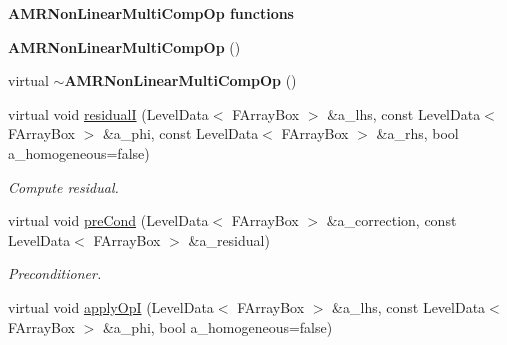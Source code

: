 \begin{Indent}{\bf A\-M\-R\-Non\-Linear\-Multi\-Comp\-Op functions}\par
\begin{DoxyCompactItemize}
\item 
\hypertarget{class_a_m_r_non_linear_multi_comp_op_a2205291922bf767821fcbeb13f52a338}{{\bfseries A\-M\-R\-Non\-Linear\-Multi\-Comp\-Op} ()}\label{class_a_m_r_non_linear_multi_comp_op_a2205291922bf767821fcbeb13f52a338}

\item 
\hypertarget{class_a_m_r_non_linear_multi_comp_op_a6f358cdb028df9d5a9d274fda7c77a77}{virtual {\bfseries $\sim$\-A\-M\-R\-Non\-Linear\-Multi\-Comp\-Op} ()}\label{class_a_m_r_non_linear_multi_comp_op_a6f358cdb028df9d5a9d274fda7c77a77}

\item 
\hypertarget{class_a_m_r_non_linear_multi_comp_op_a8c6014f3d9208f5184d09d700876335b}{virtual void \hyperlink{class_a_m_r_non_linear_multi_comp_op_a8c6014f3d9208f5184d09d700876335b}{residual\-I} (Level\-Data$<$ F\-Array\-Box $>$ \&a\-\_\-lhs, const Level\-Data$<$ F\-Array\-Box $>$ \&a\-\_\-phi, const Level\-Data$<$ F\-Array\-Box $>$ \&a\-\_\-rhs, bool a\-\_\-homogeneous=false)}\label{class_a_m_r_non_linear_multi_comp_op_a8c6014f3d9208f5184d09d700876335b}

\begin{DoxyCompactList}\small\item\em Compute residual. \end{DoxyCompactList}\item 
\hypertarget{class_a_m_r_non_linear_multi_comp_op_aef99970c9405719bde322dde73ba1aff}{virtual void \hyperlink{class_a_m_r_non_linear_multi_comp_op_aef99970c9405719bde322dde73ba1aff}{pre\-Cond} (Level\-Data$<$ F\-Array\-Box $>$ \&a\-\_\-correction, const Level\-Data$<$ F\-Array\-Box $>$ \&a\-\_\-residual)}\label{class_a_m_r_non_linear_multi_comp_op_aef99970c9405719bde322dde73ba1aff}

\begin{DoxyCompactList}\small\item\em Preconditioner. \end{DoxyCompactList}\item 
\hypertarget{class_a_m_r_non_linear_multi_comp_op_a8313cc6520e242cfc9eb796038268bb6}{virtual void \hyperlink{class_a_m_r_non_linear_multi_comp_op_a8313cc6520e242cfc9eb796038268bb6}{apply\-Op\-I} (Level\-Data$<$ F\-Array\-Box $>$ \&a\-\_\-lhs, const Level\-Data$<$ F\-Array\-Box $>$ \&a\-\_\-phi, bool a\-\_\-homogeneous=false)}\label{class_a_m_r_non_linear_multi_comp_op_a8313cc6520e242cfc9eb796038268bb6}


\end{DoxyCompactItemize}
\end{Indent}
